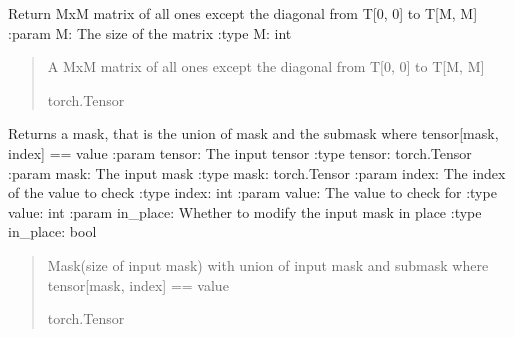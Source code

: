 \documentclass[letterpaper,10pt,english]{sphinxmanual}
\begin{document}
\begin{fulllineitems}
\label{\detokenize{nodes:nodes.tensorOps.diag_zeros}}
\pysigstartsignatures
\pysiglinewithargsret
{}
{}
{}
\pysigstopsignatures
\sphinxAtStartPar
Return MxM matrix of all ones except the diagonal from T{[}0, 0{]} to T{[}M, M{]}
:param M: The size of the matrix
:type M: int
\begin{quote}\begin{description}
\sphinxAtStartPar
A MxM matrix of all ones except the diagonal from T{[}0, 0{]} to T{[}M, M{]}

\sphinxAtStartPar
torch.Tensor

\end{description}\end{quote}

\end{fulllineitems}


\begin{fulllineitems}
\label{\detokenize{nodes:nodes.tensorOps.refine_mask}}
\pysigstartsignatures
\pysiglinewithargsret
{}
{\sphinxparamcomma {}\sphinxparamcomma {}\sphinxparamcomma {}\sphinxparamcomma {}}
{}
\pysigstopsignatures
\sphinxAtStartPar
Returns a mask, that is the union of mask and the submask where tensor{[}mask, index{]} == value
:param tensor: The input tensor
:type tensor: torch.Tensor
:param mask: The input mask
:type mask: torch.Tensor
:param index: The index of the value to check
:type index: int
:param value: The value to check for
:type value: int
:param in\_place: Whether to modify the input mask in place
:type in\_place: bool
\begin{quote}\begin{description}
\sphinxAtStartPar
Mask(size of input mask) with union of input mask and submask where tensor{[}mask, index{]} == value

\sphinxAtStartPar
torch.Tensor

\end{description}\end{quote}

\end{fulllineitems}
\end{document}
